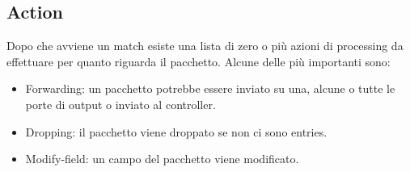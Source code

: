 \subsection{Action}
Dopo che avviene un match esiste una lista di zero o pi\`u azioni di processing da effettuare per quanto riguarda il pacchetto. Alcune delle pi\`u 
importanti sono:
\begin{itemize}
\item Forwarding: un pacchetto potrebbe essere inviato su una, alcune o tutte le porte di output o inviato al controller.
\item Dropping: il pacchetto viene droppato se non ci sono entries.
\item Modify-field: un campo del pacchetto viene modificato.
\end{itemize}
